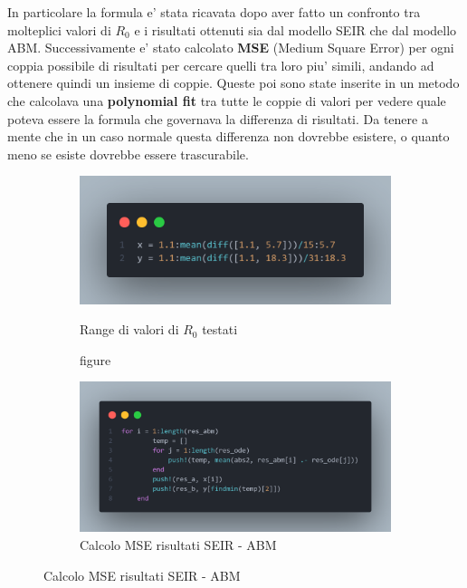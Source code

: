 In particolare la formula e' stata ricavata dopo aver fatto un confronto tra molteplici 
valori di $R_0$ e i risultati ottenuti sia dal modello SEIR che dal modello ABM. 
Successivamente e' stato calcolato \textbf{MSE} (Medium Square Error) per ogni coppia possibile
di risultati per cercare quelli tra loro piu' simili, andando ad ottenere quindi un insieme
di coppie. Queste poi sono state inserite in un metodo che calcolava una \textbf{polynomial fit} \cite{wiki:Polynomial_regression}
tra tutte le coppie di valori per vedere quale poteva essere la formula che governava la differenza 
di risultati. Da tenere a mente che in un caso normale questa differenza non dovrebbe esistere, 
o quanto meno se esiste dovrebbe essere trascurabile.

\begin{figure}[!hb]
	\centering
	\begin{subfigure}[b]{0.45\textwidth}
		\centering
		\includegraphics[width=\textwidth]{img/r0_range_test.png}
    	\caption{figure}{Range di valori di $R_0$ testati}
    	\label{fig:r0_range_test}
	\end{subfigure}
	\hfill
	\begin{subfigure}[b]{0.45\textwidth}
		\centering
		\includegraphics[width=\textwidth]{img/mse_r0.png}
		\caption{Calcolo MSE risultati SEIR - ABM}
		\label{fig:mse_r0}
	\end{subfigure}
\end{figure}


